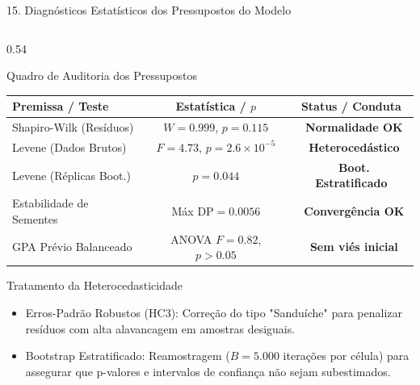 \documentclass[aspectratio=169, 10pt]{beamer}
\newcommand{\cmark}{\textcolor{StatusGreen}{\ding{51}}}
\newcommand{\tmark}{\textcolor{StatusAmber}{\ding{115}}}
\begin{document}
\begin{frame}{15. Diagnósticos Estatísticos dos Pressupostos do Modelo}
    \begin{columns}[T]
        \begin{column}{0.54\textwidth}
            \begin{block}{Quadro de Auditoria dos Pressupostos}
                \centering \small
                \begin{tabular}{lcc}
                    \toprule
                    \textbf{Premissa / Teste} & \textbf{Estatística / $p$} & \textbf{Status / Conduta} \\
                    \midrule
                    Shapiro-Wilk (Resíduos) & $W = 0.999$, $p = 0.115$ & \cmark\ \textbf{Normalidade OK} \\
                    Levene (Dados Brutos) & $F = 4.73$, $p = 2.6 \times 10^{-5}$ & \tmark\ \textbf{Heterocedástico} \\
                    Levene (Réplicas Boot.) & $p = 0.044$ & \tmark\ \textbf{Boot. Estratificado} \\
                    Estabilidade de Sementes & Máx $\text{DP} = 0.0056$ & \cmark\ \textbf{Convergência OK} \\
                    GPA Prévio Balanceado & ANOVA $F=0.82$, $p > 0.05$ & \cmark\ \textbf{Sem viés inicial} \\
                    \bottomrule
                \end{tabular}
            \end{block}

            \begin{block}{Tratamento da Heterocedasticidade}
                \begin{itemize}\footnotesize
                    \item Erros-Padrão Robustos (HC3): Correção do tipo "Sanduíche" para penalizar resíduos com alta alavancagem em amostras desiguais.
                    \item Bootstrap Estratificado: Reamostragem ($B = 5.000$ iterações por célula) para assegurar que p-valores e intervalos de confiança não sejam subestimados.   
                \end{itemize}
            \end{block}
        \end{column}


\end{columns}
\end{frame}
\end{document}
